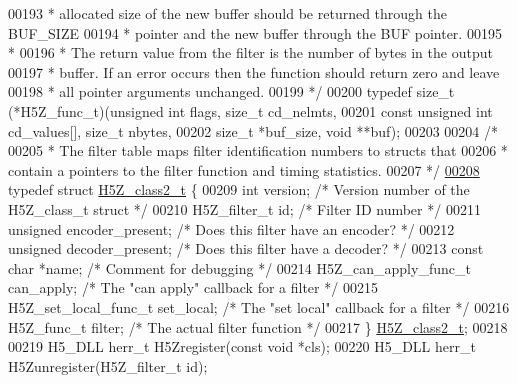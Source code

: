 \begin{DoxyCode}
00193 \textcolor{comment}{ * allocated size of the new buffer should be returned through the BUF\_SIZE}
00194 \textcolor{comment}{ * pointer and the new buffer through the BUF pointer.}
00195 \textcolor{comment}{ *}
00196 \textcolor{comment}{ * The return value from the filter is the number of bytes in the output}
00197 \textcolor{comment}{ * buffer. If an error occurs then the function should return zero and leave}
00198 \textcolor{comment}{ * all pointer arguments unchanged.}
00199 \textcolor{comment}{ */}
00200 \textcolor{keyword}{typedef} size\_t (*H5Z\_func\_t)(\textcolor{keywordtype}{unsigned} \textcolor{keywordtype}{int} flags, \textcolor{keywordtype}{size\_t} cd\_nelmts,
00201                  \textcolor{keyword}{const} \textcolor{keywordtype}{unsigned} \textcolor{keywordtype}{int} cd\_values[], \textcolor{keywordtype}{size\_t} nbytes,
00202                  \textcolor{keywordtype}{size\_t} *buf\_size, \textcolor{keywordtype}{void} **buf);
00203 
00204 \textcolor{comment}{/*}
00205 \textcolor{comment}{ * The filter table maps filter identification numbers to structs that}
00206 \textcolor{comment}{ * contain a pointers to the filter function and timing statistics.}
00207 \textcolor{comment}{ */}
\hyperlink{struct_h5_z__class2__t}{00208} \textcolor{keyword}{typedef} \textcolor{keyword}{struct }\hyperlink{struct_h5_z__class2__t}{H5Z\_class2\_t} \{
00209     \textcolor{keywordtype}{int} version;                \textcolor{comment}{/* Version number of the H5Z\_class\_t struct */}
00210     H5Z\_filter\_t id;        \textcolor{comment}{/* Filter ID number              */}
00211     \textcolor{keywordtype}{unsigned} encoder\_present;   \textcolor{comment}{/* Does this filter have an encoder? */}
00212     \textcolor{keywordtype}{unsigned} decoder\_present;   \textcolor{comment}{/* Does this filter have a decoder? */}
00213     \textcolor{keyword}{const} \textcolor{keywordtype}{char}  *name;      \textcolor{comment}{/* Comment for debugging             */}
00214     H5Z\_can\_apply\_func\_t can\_apply; \textcolor{comment}{/* The "can apply" callback for a filter */}
00215     H5Z\_set\_local\_func\_t set\_local; \textcolor{comment}{/* The "set local" callback for a filter */}
00216     H5Z\_func\_t filter;      \textcolor{comment}{/* The actual filter function            */}
00217 \} \hyperlink{struct_h5_z__class2__t}{H5Z\_class2\_t};
00218 
00219 H5\_DLL herr\_t H5Zregister(\textcolor{keyword}{const} \textcolor{keywordtype}{void} *cls);
00220 H5\_DLL herr\_t H5Zunregister(H5Z\_filter\_t \textcolor{keywordtype}{id});

\end{DoxyCode}
